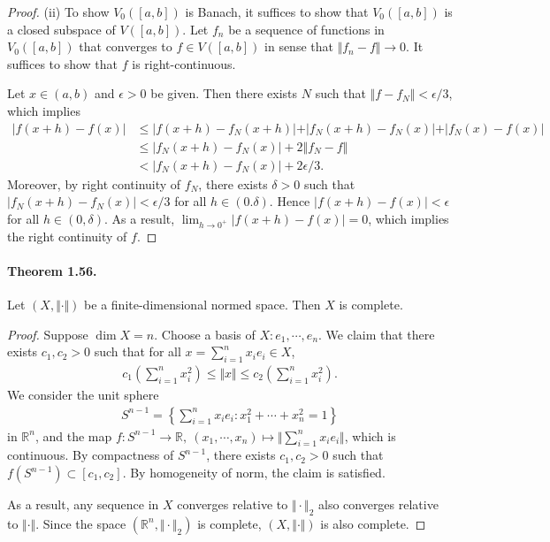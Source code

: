 \documentclass{article}
\begin{document}
\begin{proof}
(ii) To show $V_0([a,b])$ is Banach, it suffices to show that $V_0([a,b])$ is a closed subspace of $V([a,b])$. Let $f_n$ be a sequence of functions in $V_0([a,b])$ that converges to $f\in V([a,b])$ in sense that $\Vert f_n-f\Vert\to 0$. It suffices to show that $f$ is right-continuous. 

Let $x\in(a,b)$ and $\epsilon>0$ be given. Then there exists $N$ such that $\Vert f - f_N\Vert <\epsilon/3$, which implies
\begin{align*}
\vert f(x+h) - f(x)\vert &\leq \vert f(x+h) - f_N(x+h)\vert + \vert f_N(x+h) - f_N(x)\vert + \vert f_N(x) - f(x)\vert\\
&\leq \vert f_N(x+h) - f_N(x)\vert + 2\Vert f_N - f\Vert\\
&< \vert f_N(x+h) - f_N(x)\vert + 2\epsilon/3.
\end{align*}
Moreover, by right continuity of $f_N$, there exists $\delta > 0$ such that $\vert f_N(x+h) - f_N(x)\vert < \epsilon/3$ for all $h\in(0.\delta)$. Hence $\vert f(x+h) - f(x)\vert < \epsilon$ for all $h\in(0,\delta)$. As a result, $\lim_{h\to 0^+}\vert f(x+h)-f(x)\vert = 0$, which implies the right continuity of $f$.
\end{proof}


\paragraph{Theorem 1.56.\label{thm:1.56}} Let $(X,\Vert\cdot\Vert)$ be a finite-dimensional normed space. Then $X$ is complete.
\begin{proof}
Suppose $\dim X=n$. Choose a basis of $X:e_1,\cdots,e_n$. We claim that there exists $c_1,c_2>0$ such that for all $x=\sum_{i=1}^n x_ie_i\in X$,
\begin{align*}
	c_1\left(\sum_{i=1}^n x_i^2\right) \leq \Vert x\Vert \leq c_2\left(\sum_{i=1}^n x_i^2\right).
\end{align*}
We consider the unit sphere 
\begin{align*}
	S^{n-1}=\left\{\sum_{i=1}^n x_ie_i:x_1^2 + \cdots + x_n^2=1\right\}
\end{align*}
in $\mathbb{R}^n$, and the map $f:S^{n-1}\to\mathbb{R},\ (x_1,\cdots,x_n)\mapsto \Vert \sum_{i=1}^n x_ie_i\Vert$, which is continuous. By compactness of $S^{n-1}$, there exists $c_1,c_2>0$ such that $f(S^{n-1})\subset[c_1,c_2]$. By homogeneity of norm, the claim is satisfied.
\vspace{0.1cm}

As a result, any sequence in $X$ converges relative to $\Vert\cdot\Vert_2$ also converges relative to $\Vert\cdot\Vert$. Since the space $(\mathbb{R}^n,\Vert\cdot\Vert_2)$ is complete, $(X,\Vert\cdot\Vert)$ is also complete. 
\end{proof}
\end{document}
